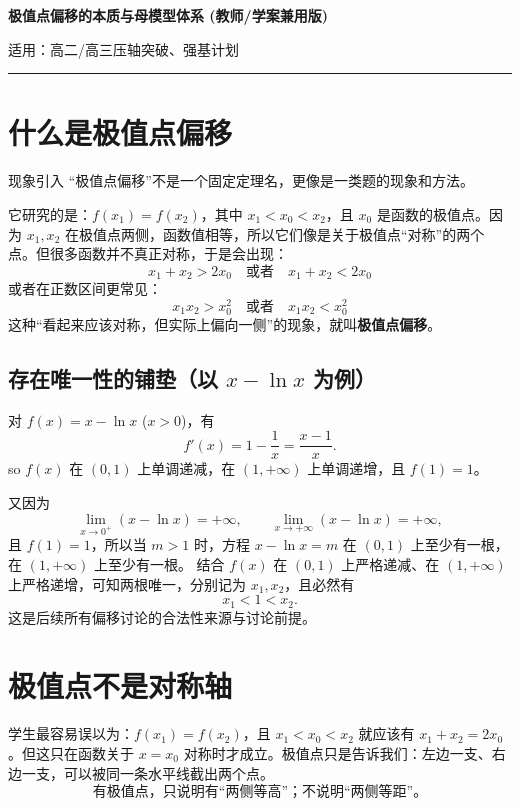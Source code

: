 \documentclass[11pt,a4paper]{ctexart}
\newcommand{\lessoninfo}[2]{%
  \begin{center}
    {\LARGE\bfseries #1 \quad (教师/学案兼用版)}\par
    \vspace{0.8em}
    {\small 适用：#2}
  \end{center}
  \vspace{0.6em}
  \rule{\linewidth}{0.5pt}
}
\begin{document}
\lessoninfo{极值点偏移的本质与母模型体系}{高二/高三压轴突破、强基计划}

\section{什么是极值点偏移}

\begin{teachbox}{现象引入}
“极值点偏移”不是一个固定定理名，更像是一类题的现象和方法。

它研究的是：$f(x_1)=f(x_2)$，其中 $x_1<x_0<x_2$，且 $x_0$ 是函数的极值点。因为 $x_1,x_2$ 在极值点两侧，函数值相等，所以它们像是关于极值点“对称”的两个点。但很多函数并不真正对称，于是会出现：
\[
x_1+x_2>2x_0 \quad \text{或者} \quad x_1+x_2<2x_0
\]
或者在正数区间更常见：
\[
x_1x_2>x_0^2 \quad \text{或者} \quad x_1x_2<x_0^2
\]
这种“看起来应该对称，但实际上偏向一侧”的现象，就叫\textbf{极值点偏移}。
\end{teachbox}

\subsection{存在唯一性的铺垫（以 $x-\ln x$ 为例）}
对 $f(x)=x-\ln x$ ($x>0$)，有
\[
f'(x)=1-\frac{1}{x}=\frac{x-1}{x}.
\]
so $f(x)$ 在 $(0,1)$ 上单调递减，在 $(1,+\infty)$ 上单调递增，且 $f(1)=1$。

又因为
\[
\lim_{x\to 0^+}(x-\ln x)=+\infty,\qquad
\lim_{x\to +\infty}(x-\ln x)=+\infty,
\]
且 $f(1)=1$，所以当 $m>1$ 时，方程 $x-\ln x=m$ 在 $(0,1)$ 上至少有一根，在 $(1,+\infty)$ 上至少有一根。
结合 $f(x)$ 在 $(0,1)$ 上严格递减、在 $(1,+\infty)$ 上严格递增，可知两根唯一，分别记为 $x_1, x_2$，且必然有
\[
x_1<1<x_2.
\]
这是后续所有偏移讨论的合法性来源与讨论前提。

\section{极值点不是对称轴}
学生最容易误以为：$f(x_1)=f(x_2)$，且 $x_1<x_0<x_2$ 就应该有 $x_1+x_2=2x_0$。但这只在函数关于 $x=x_0$ 对称时才成立。极值点只是告诉我们：左边一支、右边一支，可以被同一条水平线截出两个点。
\[
\boxed{\text{有极值点，只说明有“两侧等高”；不说明“两侧等距”。}}
\]
\end{document}
